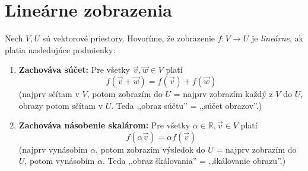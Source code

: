\section{Lineárne zobrazenia}

\begin{definicia}
Nech $V, U$ sú vektorové priestory. Hovoríme, že zobrazenie $f: V \to U$ je \emph{lineárne}, ak platia nasledujúce podmienky:
\begin{enumerate}
    \item \textbf{Zachováva súčet:} Pre všetky $\vec{v}, \vec{w} \in V$ platí
    $$ f(\vec{v} + \vec{w}) = f(\vec{v}) + f(\vec{w}) $$
    (najprv sčítam v $V$, potom zobrazím do $U$ = najprv zobrazím každý z $V$ do $U$, obrazy potom sčítam v $U$. Teda ,,obraz súčtu'' = ,,súčet obrazov''.)
    
    \item \textbf{Zachováva násobenie skalárom:} Pre všetky $\alpha \in \mathbb{R}, \vec{v} \in V$ platí
    $$ f(\alpha \vec{v}) = \alpha f(\vec{v}) $$
    (najprv vynásobím $\alpha$, potom zobrazím výsledok do $U$ = najprv zobrazím do $U$, potom vynásobím $\alpha$. Teda ,,obraz škálovania'' = ,,škálovanie obrazu''.)
\end{enumerate}
\end{definicia}

